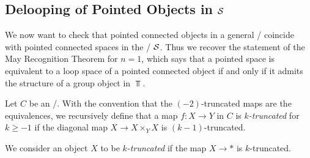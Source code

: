 \subsection*{Delooping of Pointed Objects in $\mathcal{S}$}
We now want to check that pointed connected objects in a general \inftytop/ coincide with pointed connected spaces in the \inftytop/ $\mathcal{S}$.
Thus we recover the statement of the May Recognition Theorem for $n=1$, which says that a pointed space is equivalent to a loop space of a pointed connected object if and only if it admits the structure of a group object in $\Top$. 
\begin{definition}
    Let $C$ be an \inftytop/.
    With the convention that the $(-2)$-truncated maps are the equivalences, we recursively define that a map $f\colon X\to Y$ in $C$ is \emph{$k$-truncated} for $k\geq -1$ if the diagonal map $X\to X\times_YX$ is $(k-1)$-truncated.
    
    We consider an object $X$ to be \emph{$k$-truncated} if the map $X\to *$ is $k$-truncated.
\end{definition}
